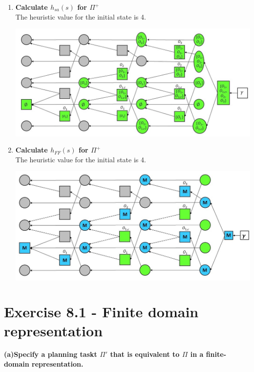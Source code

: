 \documentclass[12pt,a4paper]{article}
\begin{document}
\begin{enumerate}[label=(\alph*), listparindent=1.5em]
	\item \textbf{Calculate $h_{sa}(s)$ for $\Pi^+ $}\\
	The heuristic value for the initial state is 4.
	\begin{center}
		\includegraphics[scale=0.5]{hsa.jpg}\\
	\end{center}
	\item \textbf{Calculate $h_{FF}(s)$ for $\Pi^+ $}\\
	The heuristic value for the initial state is 4.
	\begin{center}
		\includegraphics[scale=0.5]{hff.jpg}\\
	\end{center}
\end{enumerate}

\section*{Exercise 8.1 - Finite domain representation}
\textbf{(a)Specify a planning taskt $\Pi'$ that is equivalent to $\Pi$
in a finite-domain representation.}\\
\end{document}

